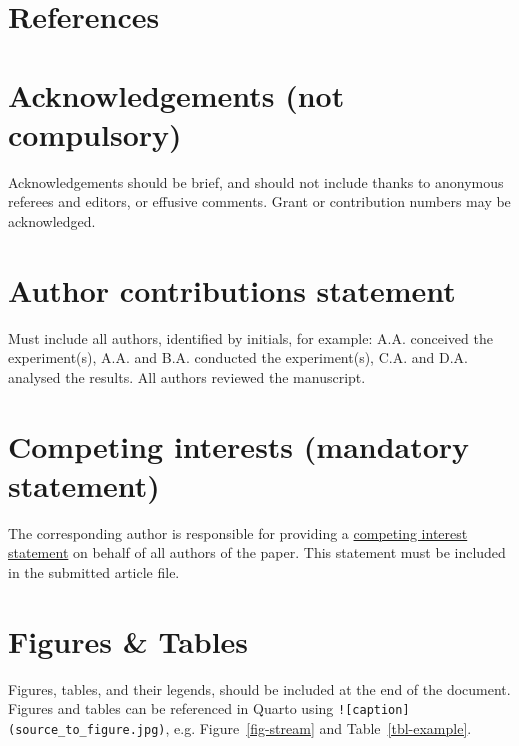 \documentclass[fleqn,10pt]{wlscirep}
\begin{document}
\hypertarget{references}{%
\section{References}\label{references}}

\renewcommand{\bibsection}{}


\hypertarget{acknowledgements-not-compulsory}{%
\section{Acknowledgements (not
compulsory)}\label{acknowledgements-not-compulsory}}

Acknowledgements should be brief, and should not include thanks to
anonymous referees and editors, or effusive comments. Grant or
contribution numbers may be acknowledged.

\hypertarget{author-contributions-statement}{%
\section{Author contributions
statement}\label{author-contributions-statement}}

Must include all authors, identified by initials, for example: A.A.
conceived the experiment(s), A.A. and B.A. conducted the experiment(s),
C.A. and D.A. analysed the results. All authors reviewed the manuscript.

\hypertarget{competing-interests-mandatory-statement}{%
\section{Competing interests (mandatory
statement)}\label{competing-interests-mandatory-statement}}

The corresponding author is responsible for providing a
\href{https://www.nature.com/sdata/policies/editorial-and-publishing-policies\#competing}{competing
interest statement} on behalf of all authors of the paper. This
statement must be included in the submitted article file.

\hypertarget{figures-tables}{%
\section{Figures \& Tables}\label{figures-tables}}

Figures, tables, and their legends, should be included at the end of the
document. Figures and tables can be referenced in Quarto using
\texttt{!{[}caption{]}(source\_to\_figure.jpg)}, e.g.
Figure~\ref{fig-stream} and Table~\ref{tbl-example}.
\end{document}
